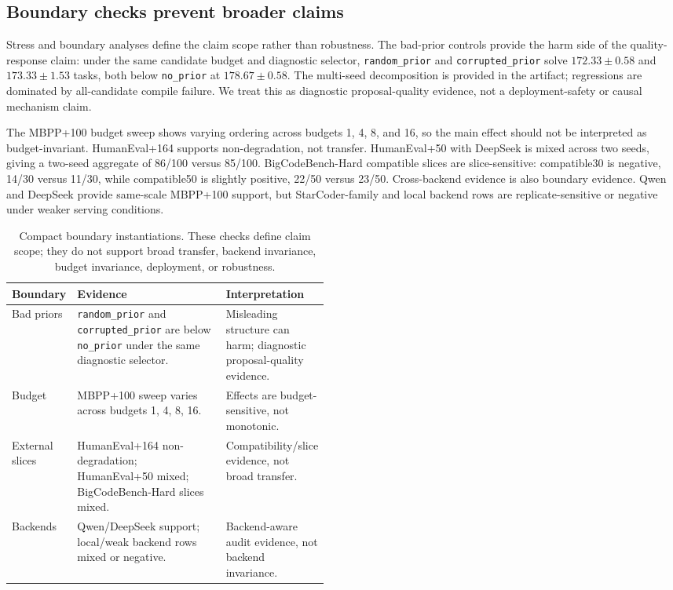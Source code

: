 \documentclass{article}
\begin{document}
\subsection{Boundary checks prevent broader claims}
Stress and boundary analyses define the claim scope rather than robustness. The bad-prior controls provide the harm side of the quality-response claim: under the same candidate budget and diagnostic selector, \texttt{random\_prior} and \texttt{corrupted\_prior} solve $172.33 \pm 0.58$ and $173.33 \pm 1.53$ tasks, both below \texttt{no\_prior} at $178.67 \pm 0.58$. The multi-seed decomposition is provided in the artifact; regressions are dominated by all-candidate compile failure. We treat this as diagnostic proposal-quality evidence, not a deployment-safety or causal mechanism claim.

The MBPP+100 budget sweep shows varying ordering across budgets 1, 4, 8, and 16, so the main effect should not be interpreted as budget-invariant. HumanEval+164 supports non-degradation, not transfer. HumanEval+50 with DeepSeek is mixed across two seeds, giving a two-seed aggregate of 86/100 versus 85/100. BigCodeBench-Hard compatible slices are slice-sensitive: compatible30 is negative, 14/30 versus 11/30, while compatible50 is slightly positive, 22/50 versus 23/50. Cross-backend evidence is also boundary evidence. Qwen and DeepSeek provide same-scale MBPP+100 support, but StarCoder-family and local backend rows are replicate-sensitive or negative under weaker serving conditions.

\begin{table}[t]
\centering
\small
\begin{tabularx}{\linewidth}{p{0.16\linewidth}Yp{0.31\linewidth}}
\toprule
Boundary & Evidence & Interpretation \\
\midrule
Bad priors & \texttt{random\_prior} and \texttt{corrupted\_prior} are below \texttt{no\_prior} under the same diagnostic selector. & Misleading structure can harm; diagnostic proposal-quality evidence. \\
Budget & MBPP+100 sweep varies across budgets 1, 4, 8, 16. & Effects are budget-sensitive, not monotonic. \\
External slices & HumanEval+164 non-degradation; HumanEval+50 mixed; BigCodeBench-Hard slices mixed. & Compatibility/slice evidence, not broad transfer. \\
Backends & Qwen/DeepSeek support; local/weak backend rows mixed or negative. & Backend-aware audit evidence, not backend invariance. \\
\bottomrule
\end{tabularx}
\caption{Compact boundary instantiations. These checks define claim scope; they do not support broad transfer, backend invariance, budget invariance, deployment, or robustness.}
\label{tab:boundary}
\end{table}
\end{document}
